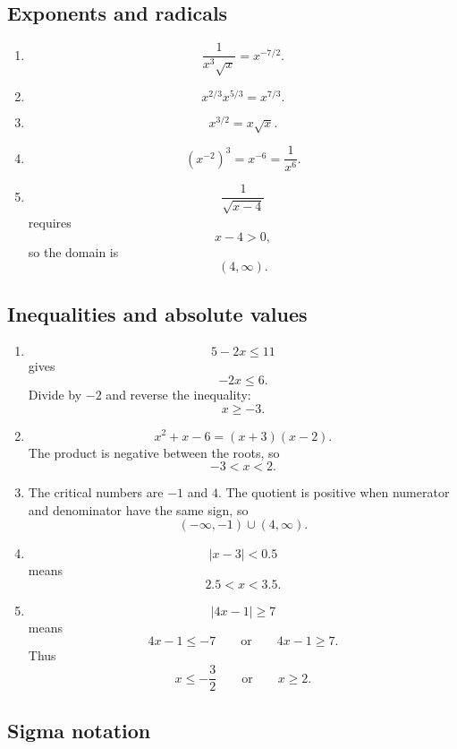 \subsection*{Exponents and radicals}

\begin{enumerate}
\item
\[
\frac{1}{x^3\sqrt{x}}=x^{-7/2}.
\]

\item
\[
x^{2/3}x^{5/3}=x^{7/3}.
\]

\item
\[
x^{3/2}=x\sqrt{x}.
\]

\item
\[
(x^{-2})^3=x^{-6}=\frac1{x^6}.
\]

\item
\[
\frac1{\sqrt{x-4}}
\]
requires
\[
x-4>0,
\]
so the domain is
\[
(4,\infty).
\]
\end{enumerate}

\subsection*{Inequalities and absolute values}

\begin{enumerate}
\item
\[
5-2x\le11
\]
gives
\[
-2x\le6.
\]
Divide by \(-2\) and reverse the inequality:
\[
x\ge -3.
\]

\item
\[
x^2+x-6=(x+3)(x-2).
\]
The product is negative between the roots, so
\[
-3<x<2.
\]

\item
The critical numbers are \(-1\) and \(4\).  The quotient is positive when numerator and
denominator have the same sign, so
\[
(-\infty,-1)\cup(4,\infty).
\]

\item
\[
|x-3|<0.5
\]
means
\[
2.5<x<3.5.
\]

\item
\[
|4x-1|\ge7
\]
means
\[
4x-1\le -7
\qquad\text{or}\qquad
4x-1\ge7.
\]
Thus
\[
x\le -\frac32
\qquad\text{or}\qquad
x\ge2.
\]
\end{enumerate}

\subsection*{Sigma notation}

